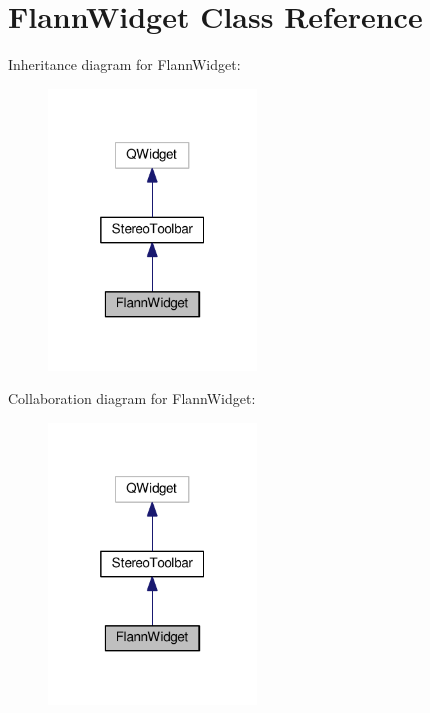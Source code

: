 \hypertarget{classFlannWidget}{}\section{Flann\+Widget Class Reference}
\label{classFlannWidget}


Inheritance diagram for Flann\+Widget\+:\nopagebreak
\begin{figure}[H]
\begin{center}
\leavevmode
\includegraphics[width=157pt]{classFlannWidget__inherit__graph}
\end{center}
\end{figure}


Collaboration diagram for Flann\+Widget\+:\nopagebreak
\begin{figure}[H]
\begin{center}
\leavevmode
\includegraphics[width=157pt]{classFlannWidget__coll__graph}
\end{center}
\end{figure}

